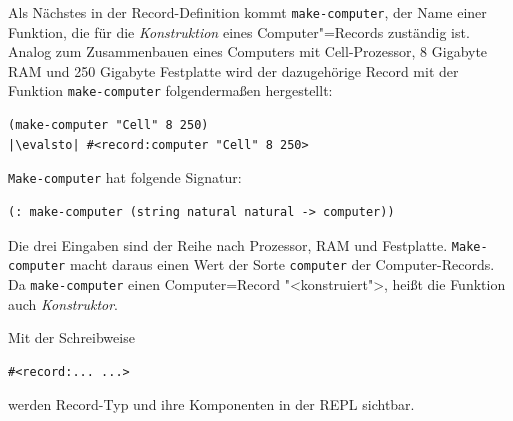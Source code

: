 Als Nächstes in der Record-Definition kommt \lstinline{make-computer},
der Name einer Funktion, die für die \textit{Konstruktion} eines
Computer"=Records zuständig ist.  Analog zum Zusammenbauen eines
Computers mit Cell-Prozessor, 8 Gigabyte RAM und 250 Gigabyte
Festplatte wird der dazugehörige Record mit der Funktion
\lstinline{make-computer} folgendermaßen hergestellt:
%
\begin{lstlisting}
(make-computer "Cell" 8 250)
|\evalsto| #<record:computer "Cell" 8 250>
\end{lstlisting}
%
\lstinline{Make-computer} hat folgende Signatur:
%
\begin{lstlisting}
(: make-computer (string natural natural -> computer))
\end{lstlisting}
%
Die drei Eingaben sind der Reihe nach Prozessor, RAM und Festplatte.
\lstinline{Make-computer} macht daraus einen Wert der Sorte
\lstinline{computer} der Computer-Records.  Da \lstinline{make-computer}
einen Computer=Record "<konstruiert">, heißt die Funktion auch
\textit{Konstruktor}.

Mit der Schreibweise
%
\begin{lstlisting}
#<record:... ...>
\end{lstlisting}
%
werden Record-Typ und ihre Komponenten in der REPL sichtbar.

